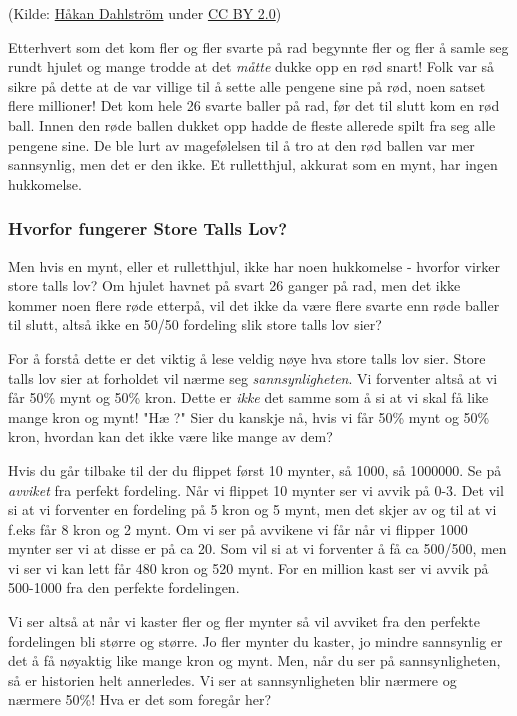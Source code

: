 \documentclass[11pt]{article}
\begin{document}
 (Kilde:
\href{https://www.flickr.com/photos/dahlstroms/5276348473}{Håkan
Dahlström} under \href{https://creativecommons.org/licenses/by/2.0/}{CC
BY 2.0})

Etterhvert som det kom fler og fler svarte på rad begynnte fler og fler
å samle seg rundt hjulet og mange trodde at det \emph{måtte} dukke opp
en rød snart! Folk var så sikre på dette at de var villige til å sette
alle pengene sine på rød, noen satset flere millioner! Det kom hele 26
svarte baller på rad, før det til slutt kom en rød ball. Innen den røde
ballen dukket opp hadde de fleste allerede spilt fra seg alle pengene
sine. De ble lurt av magefølelsen til å tro at den rød ballen var mer
sannsynlig, men det er den ikke. Et rulletthjul, akkurat som en mynt,
har ingen hukkomelse.

    \subsubsection{Hvorfor fungerer Store Talls
Lov?}\label{hvorfor-fungerer-store-talls-lov}

Men hvis en mynt, eller et rulletthjul, ikke har noen hukkomelse -
hvorfor virker store talls lov? Om hjulet havnet på svart 26 ganger på
rad, men det ikke kommer noen flere røde etterpå, vil det ikke da være
flere svarte enn røde baller til slutt, altså ikke en 50/50 fordeling
slik store talls lov sier?

For å forstå dette er det viktig å lese veldig nøye hva store talls lov
sier. Store talls lov sier at forholdet vil nærme seg
\emph{sannsynligheten}. Vi forventer altså at vi får 50\% mynt og 50\%
kron. Dette er \emph{ikke} det samme som å si at vi skal få like mange
kron og mynt! "Hæ ?" Sier du kanskje nå, hvis vi får 50\% mynt og 50\%
kron, hvordan kan det ikke være like mange av dem?

Hvis du går tilbake til der du flippet først 10 mynter, så 1000, så
1000000. Se på \emph{avviket} fra perfekt fordeling. Når vi flippet 10
mynter ser vi avvik på 0-3. Det vil si at vi forventer en fordeling på 5
kron og 5 mynt, men det skjer av og til at vi f.eks får 8 kron og 2
mynt. Om vi ser på avvikene vi får når vi flipper 1000 mynter ser vi at
disse er på ca 20. Som vil si at vi forventer å få ca 500/500, men vi
ser vi kan lett får 480 kron og 520 mynt. For en million kast ser vi
avvik på 500-1000 fra den perfekte fordelingen.

Vi ser altså at når vi kaster fler og fler mynter så vil avviket fra den
perfekte fordelingen bli større og større. Jo fler mynter du kaster, jo
mindre sannsynlig er det å få nøyaktig like mange kron og mynt. Men, når
du ser på sannsynligheten, så er historien helt annerledes. Vi ser at
sannsynligheten blir nærmere og nærmere 50\%! Hva er det som foregår
her?
\end{document}
